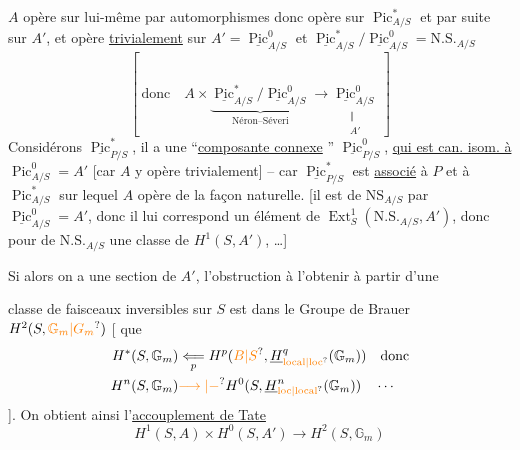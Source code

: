 $A$ opère sur lui-même par automorphismes donc opère sur $\operatorname{Pic}^*_{A/S}$ et par suite sur $A'$, et opère \uline{trivialement} sur $A'=\underline{\operatorname{Pic}}^0_{A/S}$ et $\underline{\operatorname{Pic}}^*_{A/S}/\underline{\operatorname{Pic}}^0_{A/S}=\mathrm{N.S.}_{A/S}$
\[
\left[\ \text{donc}\quad A\times\underbrace{\underline{\operatorname{Pic}}^*_{A/S}/\underline{\operatorname{Pic}}^0_{A/S}}_{\text{Néron--Séveri}}\longrightarrow\underset{\substack{\Vert\\A'}}{\underline{\operatorname{Pic}}^0_{A/S}}\ \right]
\]
Considérons $\underline{\operatorname{Pic}}^*_{P/S}$, il a une ``\uline{composante connexe} '' $\underline{\operatorname{Pic}}^0_{P/S}$, \uline{qui est can. isom. à} $\operatorname{Pic}^0_{A/S}=A'$ [car $A$ y opère trivialement] -- car $\underline{\operatorname{Pic}}^*_{P/S}$ est \uline{associé} à $P$ et à $\operatorname{Pic}^*_{A/S}$ sur lequel $A$ opère de la façon naturelle. [il est  de $\mathrm{NS}_{A/S}$ par $\underline{\operatorname{Pic}}^0_{A/S}=A'$, donc il lui correspond \margin{\deleted{$\unsure{\xi|\varepsilon|\lambda}$}} un élément de $\operatorname{Ext}^1_S(\mathrm{N.S.}_{A/S},A')$, donc pour    de $\mathrm{N.S.}_{A/S}$ une classe de $H^1(S,A')$,  \ldots]

Si alors on a une section de $A'$, l'obstruction à l'obtenir à partir d'une

classe de faisceaux inversibles   sur $S$ est dans le Groupe de Brauer $H^2(S,\unsure{\mathbb G_m|G_m})$ [ que
\[
\begin{aligned}
H^*(S,\mathbb G_m)&\underset{p}{\Longleftarrow} H^p(\unsure{B|S},\underline H^q_{\unsure{\mathrm{local}|\mathrm{loc}}}(\mathbb G_m))\quad\text{donc}\\
H^n(S,\mathbb G_m)&\unsure{\longrightarrow|-} H^0(S,\underline H^n_{\unsure{\mathrm{loc}|\mathrm{local}}}(\mathbb G_m))\quad\cdots
\end{aligned}
\]
]. On obtient ainsi l'\uline{accouplement de Tate}
\[
\boxed{H^1(S,A)\times H^0(S,A')\longrightarrow H^2(S,\mathbb G_m)}
\]

